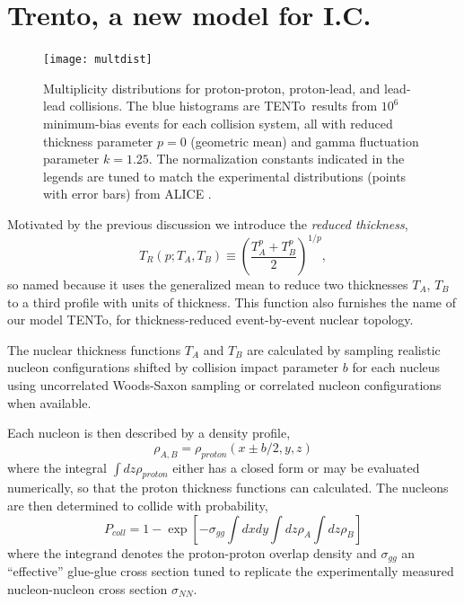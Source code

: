 \documentclass[aps,prc,reprint,amsmath,nofootinbib]{revtex4-1}
\newcommand{\trento}{T\raisebox{-.5ex}{R}ENTo}
\begin{document}
\section{Trento, a new model for I.C.}

\begin{figure}[t]
  \texttt{[image: multdist]}
  \caption{
    \label{fig:multdist}
    Multiplicity distributions for proton-proton, proton-lead, and lead-lead collisions.  The blue histograms
    are \protect\trento\ results from $10^6$ minimum-bias events for each collision system, all with reduced
    thickness parameter $p = 0$ (geometric mean) and gamma fluctuation parameter $k = 1.25$.  The normalization
    constants indicated in the legends are tuned to match the experimental distributions
    (points with error bars) from ALICE \cite{Aamodt:2010ft,Abelev:2014mda}.
  }
\end{figure}

Motivated by the previous discussion we introduce the \emph{reduced thickness},
\begin{equation}
 T_R(p;T_A,T_B) \equiv \left(\frac{T_A^p + T_B^p}{2} \right) ^{1/p},
\end{equation}
so named because it uses the generalized mean to reduce two thicknesses $T_A$, $T_B$ to a third profile with units of thickness. This function also furnishes the name of our
model \trento, for thickness-reduced event-by-event nuclear topology. 

The nuclear thickness functions $T_A$ and $T_B$ are calculated by sampling realistic nucleon configurations shifted by collision impact parameter $b$ for each 
nucleus using uncorrelated Woods-Saxon sampling or correlated nucleon configurations when available.

Each nucleon is then described by a density profile,
\begin{equation}
 \rho_{A,B} = \rho_{proton}(x \pm b/2,y,z)
\end{equation}
where the integral $\int dz \rho_{proton}$ either has a closed form or may be evaluated numerically, so that the proton thickness functions can calculated.
The nucleons are then determined to collide with probability,
\begin{equation}
 P_{coll} = 1 - \exp \left[ -\sigma_{gg} \int dx dy \int dz \rho_A \int dz \rho_B \right]
\end{equation}
where the integrand denotes the proton-proton overlap density and $\sigma_{gg}$ an ``effective'' glue-glue cross section tuned to replicate the experimentally 
measured nucleon-nucleon cross section $\sigma_{NN}$.
\end{document}
